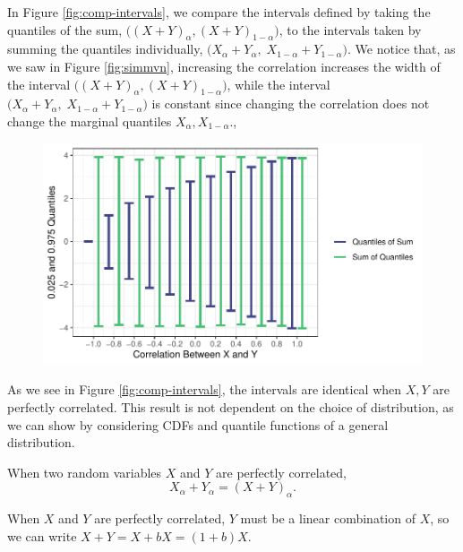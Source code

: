 \documentclass[12pt,twoside]{smiththesis}
\begin{document}
\begin{figure}
{}

\caption{\label{fig:simmvn}}\label{fig:unnamed-chunk-86}
\end{figure}
In Figure \ref{fig:comp-intervals}, we compare the intervals defined by taking the quantiles of the sum, \(\Big((X+Y)_\alpha, (X+Y)_{1-\alpha}\Big)\), to the intervals taken by summing the quantiles individually, \(\Big(X_\alpha +Y_\alpha, \; X_{1-\alpha} +Y_{1-\alpha}\Big)\). We notice that, as we saw in Figure \ref{fig:simmvn}, increasing the correlation increases the width of the interval \(\Big((X+Y)_\alpha, (X+Y)_{1-\alpha}\Big)\), while the interval \(\Big(X_\alpha +Y_\alpha, \; X_{1-\alpha} +Y_{1-\alpha}\Big)\) is constant since changing the correlation does not change the marginal quantiles \(X_\alpha, X_{1-\alpha}\).,
\begin{figure}

{\centering \includegraphics[width=1\linewidth]{thesis_files/figure-latex/unnamed-chunk-87-1} 

}

\caption{\label{fig:comp-intervals}}\label{fig:unnamed-chunk-87}
\end{figure}
As we see in Figure \ref{fig:comp-intervals}, the intervals are identical when \(X,Y\) are perfectly correlated. This result is not dependent on the choice of distribution, as we can show by considering CDFs and quantile functions of a general distribution.
\begin{tcolorbox}[title = Quantiles of the Sum of Perfectly Correlated Random Variables]
When two random variables $X$ and $Y$ are perfectly correlated,
$$X_\alpha + Y_\alpha = (X+Y)_\alpha.$$
\end{tcolorbox}
When \(X\) and \(Y\) are perfectly correlated, \(Y\) must be a linear combination of \(X\), so we can write \(X+Y= X+bX=(1+b)X\).
\end{document}
